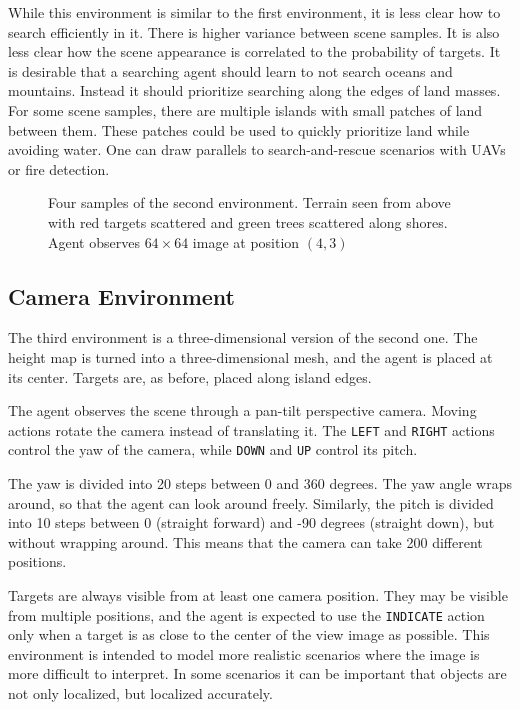 While this environment is similar to the first environment, it is less clear how to search efficiently in it.
There is higher variance between scene samples.
It is also less clear how the scene appearance is correlated to the probability of targets.
It is desirable that a searching agent should learn to not search oceans and mountains.
Instead it should prioritize searching along the edges of land masses.
For some scene samples, there are multiple islands with small patches of land between them.
These patches could be used to quickly prioritize land while avoiding water.
One can draw parallels to search-and-rescue scenarios with UAVs or fire detection.

\begin{figure}
    \centering
    
    \label{fig:terrain}
    \caption[Terrain environment]{Four samples of the second environment. Terrain seen from above with red targets scattered and green trees scattered along shores. Agent observes \(64 \times 64\) image at position \((4, 3)\)}
\end{figure}

\subsection{Camera Environment}

The third environment is a three-dimensional version of the second one.
The height map is turned into a three-dimensional mesh, and the agent is placed at its center.
Targets are, as before, placed along island edges.

The agent observes the scene through a pan-tilt perspective camera.
Moving actions rotate the camera instead of translating it.
The \texttt{LEFT} and \texttt{RIGHT} actions control the yaw of the camera, while \texttt{DOWN} and \texttt{UP} control its pitch.

The yaw is divided into 20 steps between 0 and 360 degrees.
The yaw angle wraps around, so that the agent can look around freely.
Similarly, the pitch is divided into 10 steps between 0 (straight forward) and -90 degrees (straight down), but without wrapping around.
This means that the camera can take 200 different positions.

Targets are always visible from at least one camera position.
They may be visible from multiple positions, and the agent is expected to use the \texttt{INDICATE} action only when a target is as close to the center of the view image as possible.
This environment is intended to model more realistic scenarios where the image is more difficult to interpret.
In some scenarios it can be important that objects are not only localized, but localized accurately.


